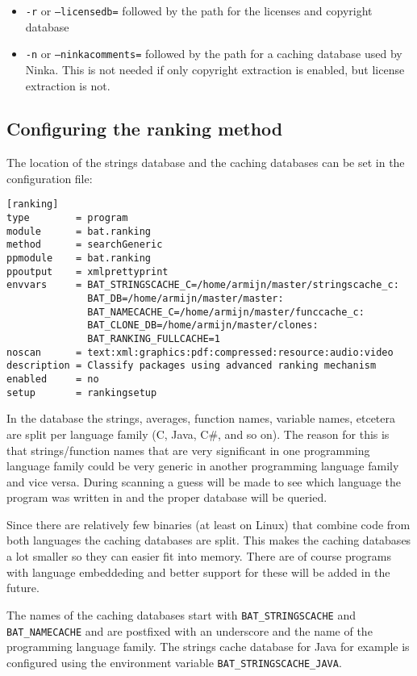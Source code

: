 \documentclass[10pt]{article}
\begin{document}
\begin{itemize}
\item \texttt{-r} or \texttt{--licensedb=} followed by the path for the
licenses and copyright database
\item \texttt{-n} or \texttt{--ninkacomments=} followed by the path for a
caching database used by Ninka. This is not needed if only copyright extraction
is enabled, but license extraction is not.
\end{itemize}

\subsection{Configuring the ranking method}

The location of the strings database and the caching databases can
be set in the configuration file:

\begin{verbatim}
[ranking]
type        = program
module      = bat.ranking
method      = searchGeneric
ppmodule    = bat.ranking
ppoutput    = xmlprettyprint
envvars     = BAT_STRINGSCACHE_C=/home/armijn/master/stringscache_c:
              BAT_DB=/home/armijn/master/master:
              BAT_NAMECACHE_C=/home/armijn/master/funccache_c:
              BAT_CLONE_DB=/home/armijn/master/clones:
              BAT_RANKING_FULLCACHE=1
noscan      = text:xml:graphics:pdf:compressed:resource:audio:video
description = Classify packages using advanced ranking mechanism
enabled     = no
setup       = rankingsetup
\end{verbatim}

In the database the strings, averages, function names, variable names, etcetera
are split per language family (C, Java, C\#, and so on). The reason for this is
that strings/function names that are very significant in one programming
language family could be very generic in another programming language family
and vice versa. During scanning a guess will be made to see which language the
program was written in and the proper database will be queried.

Since there are relatively few binaries (at least on Linux) that combine
code from both languages the caching databases are split. This makes the
caching databases a lot smaller so they can easier fit into memory. There are
of course programs with language embeddeding and better support for these will
be added in the future.

The names of the caching databases start with
\texttt{BAT\_STRINGSCACHE} and \texttt{BAT\_NAMECACHE} and are
postfixed with an underscore and the name of the programming language family.
The strings cache database for Java for example is configured using the
environment variable \texttt{BAT\_STRINGSCACHE\_JAVA}.
\end{document}

